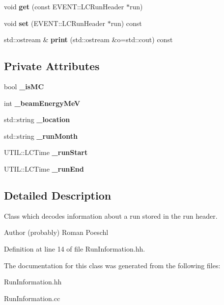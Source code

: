 \begin{DoxyCompactItemize}
\item 
void {\bfseries get} (const EVENT::LCRunHeader $\ast$run)\label{classRunInformation_ac6c3b16064852dfb9cf53d87f30d4dcc}

\item 
void {\bfseries set} (EVENT::LCRunHeader $\ast$run) const \label{classRunInformation_ac6d0c69ff29c2839e1ab34c1dba46050}

\item 
std::ostream \& {\bfseries print} (std::ostream \&o=std::cout) const \label{classRunInformation_aa1da2b6f960929a0b520df50ff757754}

\end{DoxyCompactItemize}
\subsection*{Private Attributes}
\begin{DoxyCompactItemize}
\item 
bool {\bfseries \_\-isMC}\label{classRunInformation_ae3b42f3aa7e5aa620d616740d0ae0f08}

\item 
int {\bfseries \_\-beamEnergyMeV}\label{classRunInformation_af1a7c2459c3c98dba0313148d726ae77}

\item 
std::string {\bfseries \_\-location}\label{classRunInformation_a6d90d756c207a9782c39bb70bd0a7f62}

\item 
std::string {\bfseries \_\-runMonth}\label{classRunInformation_a7d58476f3f968fe0a0393ecfcf0d338c}

\item 
UTIL::LCTime {\bfseries \_\-runStart}\label{classRunInformation_a3b743376f135df602865a20c12080e92}

\item 
UTIL::LCTime {\bfseries \_\-runEnd}\label{classRunInformation_a9a04bb6a9b5113d87ef6fbf3fb7b3656}

\end{DoxyCompactItemize}


\subsection{Detailed Description}
Class which decodes information about a run stored in the run header. \begin{DoxyAuthor}{Author}
(probably) Roman Poeschl 
\end{DoxyAuthor}


Definition at line 14 of file RunInformation.hh.

The documentation for this class was generated from the following files:\begin{DoxyCompactItemize}
\item 
RunInformation.hh\item 
RunInformation.cc\end{DoxyCompactItemize}
